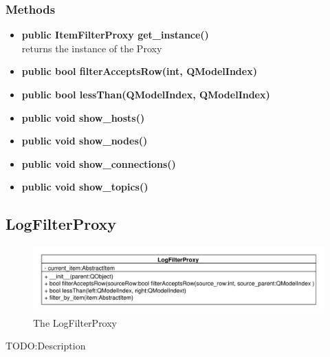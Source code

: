 \subsubsection{Methods}
\begin{itemize}
  
  \item \textbf{public ItemFilterProxy get\_instance()}\\
  returns the instance of the Proxy
  \item \textbf{public bool filterAcceptsRow(int, QModelIndex)}\\
  
  \item \textbf{public bool lessThan(QModelIndex, QModelIndex)}\\
  
  \item \textbf{public void show\_hosts()}\\
  
  \item \textbf{public void show\_nodes()}\\
  
  \item \textbf{public void show\_connections()}\\
  
  \item \textbf{public void show\_topics()}\\
  
\end{itemize}

\subsection{LogFilterProxy}
\begin{figure}[htbp]
	\begin{minipage}[t]{7cm}
		\vspace{0pt}
		\centering
		\includegraphics[scale=0.6]{./diagram_pictures/LogFilter.pdf}
		\caption{The LogFilterProxy}
	\end{minipage}
\end{figure} 
TODO:Description	

